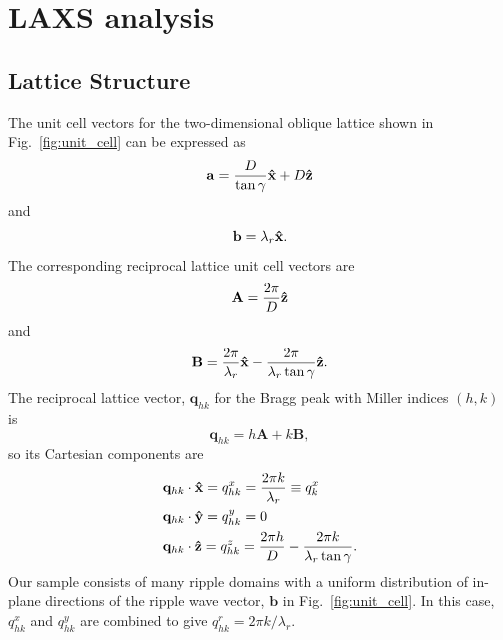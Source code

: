 \section{LAXS analysis}
\subsection{Lattice Structure}\label{sec:lattice_structure}
The unit cell vectors for the two-dimensional oblique lattice shown in Fig.~\ref{fig:unit_cell}
can be expressed as 
\begin{equation}
  \mathbf{a} = \frac{D}{\tan\gamma}\mathbf{\hat{x}} + D\mathbf{\hat{z}}
\end{equation}
and
\begin{equation}
  \mathbf{b} = \lambda_r\mathbf{\hat{x}}.
\end{equation}
The corresponding reciprocal lattice unit cell vectors are
\begin{equation}
  \mathbf{A} = \frac{2\pi}{D}\mathbf{\hat{z}}
\end{equation}
and
\begin{equation}
  \mathbf{B} = \frac{2\pi}{\lambda_r}\mathbf{\hat{x}} - \frac{2\pi}{\lambda_r\tan\gamma}\mathbf{\hat{z}}.
\end{equation}
The reciprocal lattice vector, $\mathbf{q}_{hk}$ for the Bragg peak with 
Miller indices $(h,k)$ is 
\begin{equation}
  \mathbf{q}_{hk}=h\mathbf{A}+k\mathbf{B},
\end{equation}
so its Cartesian components are
\begin{align}
  & \mathbf{q}_{hk}\cdot\mathbf{\hat{x}} = q_{hk}^x = \frac{2\pi k}{\lambda_r} \equiv q_{k}^x \\
  & \mathbf{q}_{hk}\cdot\mathbf{\hat{y}} = q_{hk}^y = 0 \\
  & \mathbf{q}_{hk}\cdot\mathbf{\hat{z}} = q_{hk}^z = \frac{2\pi h}{D} - \frac{2\pi k}{\lambda_r\tan\gamma}.
\end{align}
Our sample consists of many ripple domains with a uniform distribution of in-plane directions of the
ripple wave vector, $\mathbf{b}$ in Fig.~\ref{fig:unit_cell}. 
In this case, $q_{hk}^x$ and $q_{hk}^y$ are combined to 
give $q_{hk}^r = 2\pi k/\lambda_r$.

